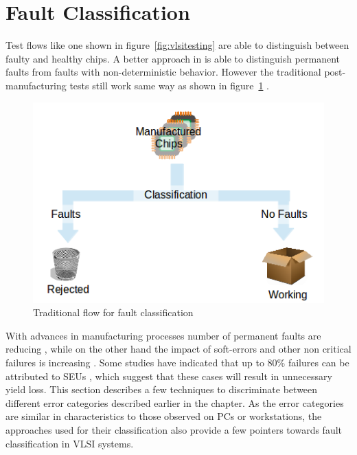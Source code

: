 \section{Fault Classification}
\label{sec:secfc}
Test flows like one shown in figure~\ref{fig:vlsitesting} are able to distinguish between faulty and healthy chips. A better approach in \cite{DeKleer2009} is able to distinguish permanent faults from faults with non-deterministic behavior. However the traditional post-manufacturing tests still work same way as shown in figure~\ref{fig:traditionaltestflow} \cite{Weste1985}. 

\begin{figure}[h]
  \begin{center}
    \captionsetup{justification=centering}
    \includegraphics[scale=0.75]{figures/traditionaltestflow.png}
    \caption{Traditional flow for fault classification}
    \label{fig:traditionaltestflow}
  \end{center}
\end{figure}

With advances in manufacturing processes number of permanent faults are reducing \cite{kishore2009}, while on the other hand the impact of soft-errors and other non critical failures is increasing \cite{Constantinescu2003}. Some studies have indicated that up to 80\% failures can be attributed to SEUs \cite{Iyer1986, Dharchoudhury1994, kishore2009}, which suggest that these cases will result in unnecessary yield loss. This section describes a few techniques to discriminate between different error categories described earlier in the chapter. As the error categories are similar in characteristics to those observed on PCs or workstations, the approaches used for their classification also provide a few pointers towards fault classification in VLSI systems. 

